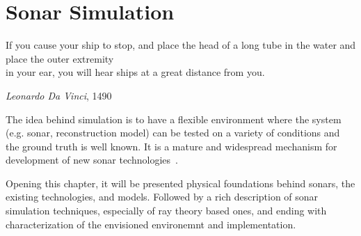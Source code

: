 \chapter{Sonar Simulation}

\epigraph{If you cause your ship to stop, and place the head of a long tube in
the water and place the outer extremity\\ in your ear, you will hear ships at a
great distance from you.}{\textit{Leonardo Da Vinci}, 1490}


The idea behind simulation is to have a flexible environment where the system
(e.g. sonar, reconstruction model) can be tested on a variety of conditions
and the ground truth is well known. It is a mature and widespread
mechanism for development of new sonar technologies~\cite{Etter2013}.

Opening this chapter, it will be presented physical foundations behind sonars,
the existing technologies, and models. Followed by a rich description of
sonar simulation techniques, especially of ray theory based ones, and ending
with characterization of the envisioned environemnt and implementation.





